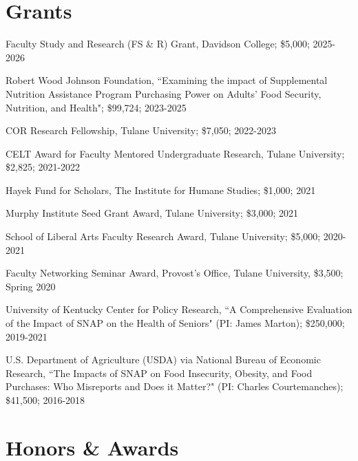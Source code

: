 \documentclass[12pt,letterpaper]{article}
\renewenvironment{itemize}{
	\begin{list}{}{
			\setlength{\leftmargin}{1em}
			\setlength{\itemsep}{0.15em}
			\setlength{\parskip}{0pt}
			\setlength{\parsep}{0.2em}
		}
	}{
	\end{list}
}
\begin{document}
\section*{Grants}

\begin{itemize}
	\item Faculty Study and Research (FS \& R) Grant, Davidson College; \$5,000; 2025-2026
	\item Robert Wood Johnson Foundation, ``Examining the impact of Supplemental Nutrition Assistance Program Purchasing Power on Adults' Food Security, Nutrition, and Health"; \$99,724; 2023-2025
	\item COR Research Fellowship, Tulane University; \$7,050; 2022-2023
	\item CELT Award for Faculty Mentored Undergraduate Research,  Tulane University; \$2,825; 2021-2022
	\item Hayek Fund for Scholars, The Institute for Humane Studies; \$1,000; 2021
	\item Murphy Institute Seed Grant Award, Tulane University; \$3,000; 2021
	\item School of Liberal Arts Faculty Research Award, Tulane University; \$5,000; 2020-2021
	\item Faculty Networking Seminar Award, Provost's Office, Tulane University, \$3,500; Spring 2020
	\item University of Kentucky Center for Policy Research, ``A Comprehensive Evaluation of the Impact of SNAP on the Health of Seniors" (PI: James Marton); \$250,000; 2019-2021
	\item U.S. Department of Agriculture (USDA) via National Bureau of Economic Research, ``The Impacts of SNAP on Food Insecurity, Obesity, and Food Purchases: Who Misreports and Does it Matter?" (PI: Charles Courtemanches); \$41,500; 2016-2018
\end{itemize}

\section*{Honors \& Awards}
\end{document}
